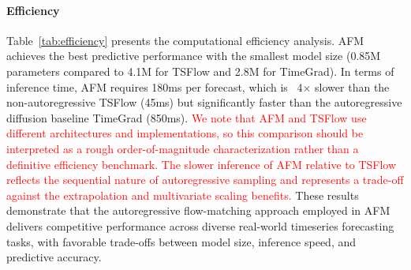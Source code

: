 \documentclass[a4paper,10pt,twocolumn,preprint,3p]{elsarticle}
\begin{document}
\paragraph{Efficiency}
Table~\ref{tab:efficiency} presents the computational efficiency analysis. AFM achieves the best predictive performance with the smallest model size (0.85M parameters compared to 4.1M for TSFlow and 2.8M for TimeGrad). In terms of inference time, AFM requires 180ms per forecast, which is ~4× slower than the non-autoregressive TSFlow (45ms) but significantly faster than the autoregressive diffusion baseline TimeGrad (850ms). \textcolor{red}{We note that AFM and TSFlow use different architectures and implementations, so this comparison should be interpreted as a rough order-of-magnitude characterization rather than a definitive efficiency benchmark. The slower inference of AFM relative to TSFlow reflects the sequential nature of autoregressive sampling and represents a trade-off against the extrapolation and multivariate scaling benefits.} These results demonstrate that the autoregressive flow-matching approach employed in AFM delivers competitive performance across diverse real-world timeseries forecasting tasks, with favorable trade-offs between model size, inference speed, and predictive accuracy.
\end{document}
